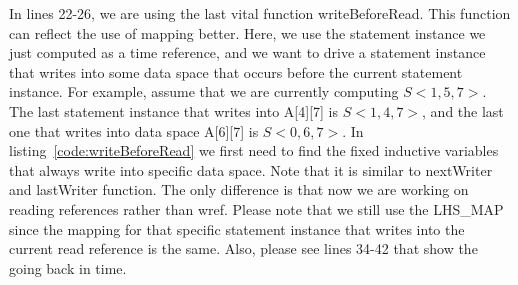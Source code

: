 \documentclass[letterpaper,12pt]{article}
\begin{document}
	In lines 22-26, we are using the last vital function writeBeforeRead. This function can reflect the use of mapping better. Here, we use the statement instance we just computed as a time reference, and we want to drive a statement instance that writes into some data space that occurs before the current statement instance. For example, assume that we are currently computing $S<1,5,7>$. The last statement instance that writes into A[4][7] is $S<1,4,7>$, and the last one that writes into data space A[6][7] is $S<0,6,7>$. In listing~\ref{code:writeBeforeRead} we first need to find the fixed inductive variables that always write into specific data space. Note that it is similar to nextWriter and lastWriter function. The only difference is that now we are working on reading references rather than wref. Please note that we still use the LHS\_MAP since the mapping for that specific statement instance that writes into the current read reference is the same. Also, please see lines 34-42 that show the going back in time.
	
\end{document}
